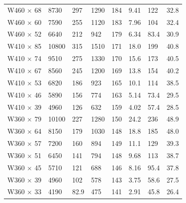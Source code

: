 \documentclass[
10pt,
a4paper,
openany,
svgnames,
]{book}
\begin{document}
\begin{table}[H]
\begin{tabular}{ L{2.2cm} R{1cm} C{2cm} C{2cm} C{1cm} C{2cm} C{2cm} C{1cm}}
    W460 $\times$ 68  & 8730  & 297  & 1290 & 184 & 9.41 & 122  & 32.8 \\
    W460 $\times$ 60  & 7590  & 255  & 1120 & 183 & 7.96 & 104  & 32.4 \\
    W460 $\times$ 52  & 6640  & 212  & 942  & 179 & 6.34 & 83.4 & 30.9 \\
    W410 $\times$ 85  & 10800 & 315  & 1510 & 171 & 18.0 & 199  & 40.8 \\
    W410 $\times$ 74  & 9510  & 275  & 1330 & 170 & 15.6 & 173  & 40.5 \\
    W410 $\times$ 67  & 8560  & 245  & 1200 & 169 & 13.8 & 154  & 40.2 \\
    W410 $\times$ 53  & 6820  & 186  & 923  & 165 & 10.1 & 114  & 38.5 \\
    W410 $\times$ 46  & 5890  & 156  & 774  & 163 & 5.14 & 73.4 & 29.5 \\
    W410 $\times$ 39  & 4960  & 126  & 632  & 159 & 4.02 & 57.4 & 28.5 \\
    W360 $\times$ 79  & 10100 & 227  & 1280 & 150 & 24.2 & 236  & 48.9 \\
    W360 $\times$ 64  & 8150  & 179  & 1030 & 148 & 18.8 & 185  & 48.0 \\
    W360 $\times$ 57  & 7200  & 160  & 894  & 149 & 11.1 & 129  & 39.3 \\
    W360 $\times$ 51  & 6450  & 141  & 794  & 148 & 9.68 & 113  & 38.7 \\
    W360 $\times$ 45  & 5710  & 121  & 688  & 146 & 8.16 & 95.4 & 37.8 \\
    W360 $\times$ 39  & 4960  & 102  & 578  & 143 & 3.75 & 58.6 & 27.5 \\
    W360 $\times$ 33  & 4190  & 82.9 & 475  & 141 & 2.91 & 45.8 & 26.4 \\
    \bottomrule
  \end{tabular}
\end{table}
\end{document}
